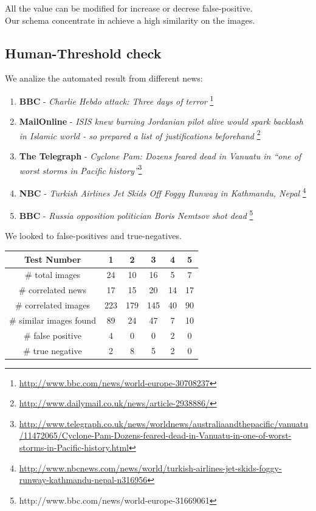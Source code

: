 \documentclass[10pt, journal,twocolumn]{IEEEtran}
\begin{document}
All the value can be modified for increase or decrese false-positive.\\
Our schema concentrate in achieve a high similarity on the images.

\subsection{Human-Threshold check}

We analize the automated result from different news:

\begin{enumerate}
  \item \textbf{BBC} - \emph{Charlie Hebdo attack: Three days of terror} \footnote{\url{http://www.bbc.com/news/world-europe-30708237}}
  \item \textbf{MailOnline} - \emph{ISIS knew burning Jordanian pilot alive would spark backlash in Islamic world - so prepared a list of justifications beforehand} \footnote{\url{http://www.dailymail.co.uk/news/article-2938886/}}
  \item \textbf{The Telegraph} - \emph{Cyclone Pam: Dozens feared dead in Vanuatu in ``one of worst storms in Pacific history''}\footnote{\url{http://www.telegraph.co.uk/news/worldnews/australiaandthepacific/vanuatu/11472065/Cyclone-Pam-Dozens-feared-dead-in-Vanuatu-in-one-of-worst-storms-in-Pacific-history.html}}
  \item \textbf{NBC} - \emph{Turkish Airlines Jet Skids Off Foggy Runway in Kathmandu, Nepal} \footnote{\url{http://www.nbcnews.com/news/world/turkish-airlines-jet-skids-foggy-runway-kathmandu-nepal-n316956}}
  \item \textbf{BBC} - \emph{Russia opposition politician Boris Nemtsov shot dead} \footnote{http://www.bbc.com/news/world-europe-31669061}
\end{enumerate}

We looked to false-positives and true-negatives.

\begin{center}
\begin{tabular}{|c||c|c|c|c|c|}
\hline
Test Number & 1 & 2 & 3 & 4 & 5 \\ \hline\hline
 \# total images & 24 & 10 & 16 & 5 & 7 \\ \hline
 \# correlated news  & 17 & 15 & 20 & 14 & 17 \\ \hline
 \# correlated images  & 223 & 179 & 145 & 40 & 90 \\ \hline
 \# similar images found & 89 & 24 & 47 & 7 & 10 \\ \hline
 \# false positive & 4 & 0 & 0 & 2 & 0 \\ \hline
 \# true negative & 2 & 8 & 5 & 2 & 0 \\ \hline
\end{tabular}
\end{center}
\end{document}
